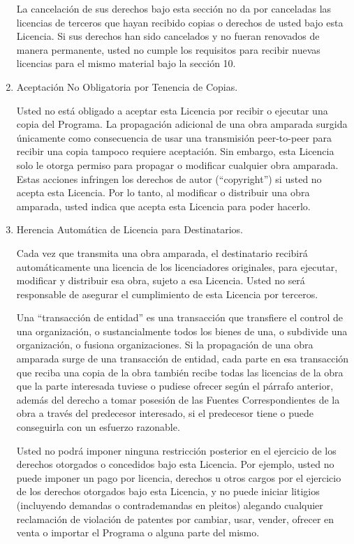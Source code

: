 \documentclass[11pt]{article}
\begin{document}
\begin{enumerate}
La cancelaci\'{o}n de sus derechos bajo esta secci\'{o}n no da por
canceladas las licencias de terceros que hayan recibido copias o
derechos de usted bajo esta Licencia.  Si sus derechos han sido
cancelados y no fueran renovados de manera permanente, usted no
cumple los requisitos para recibir nuevas licencias para el mismo
material bajo la secci\'{o}n 10.

\item Aceptaci\'{o}n No Obligatoria por Tenencia de Copias.

Usted no est\'{a} obligado a aceptar esta Licencia por recibir o
ejecutar una copia del Programa.  La propagaci\'{o}n adicional de una obra amparada surgida \'{u}nicamente como consecuencia de usar una transmisi\'{o}n peer-to-peer para recibir una copia tampoco requiere aceptaci\'{o}n.  Sin embargo, esta Licencia solo le otorga
permiso para propagar o modificar cualquier obra amparada.  Estas
acciones infringen los derechos de autor (``copyright'') si usted no acepta esta Licencia.  Por lo tanto, al modificar o distribuir una obra amparada, usted
indica que acepta esta Licencia para poder hacerlo.

\item Herencia Autom\'{a}tica de Licencia para Destinatarios.

Cada vez que transmita una obra amparada, el destinatario recibir\'{a} 
autom\'{a}ticamente una licencia de los licenciadores originales, para 
ejecutar, modificar y distribuir esa obra, sujeto a esa Licencia. 
Usted no ser\'{a} responsable de asegurar el cumplimiento de esta Licencia 
por terceros.

Una ``transacci\'{o}n de entidad'' es una transacci\'{o}n que transfiere el 
control de una organizaci\'{o}n, o sustancialmente todos los bienes de una, 
o subdivide una organizaci\'{o}n, o fusiona organizaciones. Si la 
propagaci\'{o}n de una obra amparada surge de una transacci\'{o}n de entidad, 
cada parte en esa transacci\'{o}n que reciba una copia de la obra tambi\'{e}n 
recibe todas las licencias de la obra que la parte interesada tuviese 
o pudiese ofrecer seg\'{u}n el p\'{a}rrafo anterior, adem\'{a}s del derecho a tomar 
posesi\'{o}n de las Fuentes Correspondientes de la obra a trav\'{e}s del 
predecesor interesado, si el predecesor tiene o puede conseguirla 
con un esfuerzo razonable.

Usted no podr\'{a} imponer ninguna restricci\'{o}n posterior en el ejercicio 
de los derechos otorgados o concedidos bajo esta Licencia. Por ejemplo, 
usted no puede imponer un pago por licencia, derechos u otros cargos 
por el ejercicio de los derechos otorgados bajo esta Licencia, y no 
puede iniciar litigios (incluyendo demandas o contrademandas en 
pleitos) alegando cualquier reclamaci\'{o}n de violaci\'{o}n de patentes por 
cambiar, usar, vender, ofrecer en venta o importar el Programa o 
alguna parte del mismo.


\end{enumerate}
\end{document}
